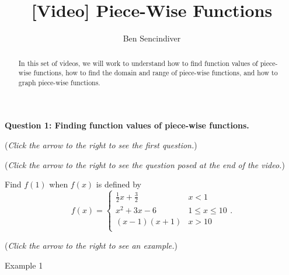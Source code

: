 \documentclass{ximera}
\title[Prerequisite Videos: ]{[Video] Piece-Wise Functions}
\author{Ben Sencindiver}
\begin{document}
\begin{abstract}
   In this set of videos, we will work to understand how to find function values of piece-wise functions, how to find the domain and range of piece-wise functions, and how to graph piece-wise functions.
\end{abstract}
\maketitle

\textbf{Question 1: Finding function values of piece-wise functions.}
\begin{question}
\begin{flushright}
{\color{blue}(\emph{Click the arrow to the right to see the first question.})}
\end{flushright}
\begin{center}
\begin{expandable}
\begin{flushright}
{\color{blue}(\emph{Click the arrow to the right to see the question
posed at the end of the video.})}
\end{flushright}
\begin{expandable}
Find $f(1)$ when $f(x)$ is defined by
\[ f(x) = \begin{cases} 
      \frac{1}{2}x + \frac{3}{2} & x<1 \\
     x^2+3x - 6 & 1\leq x\leq 10 \\
      (x-1)(x+1) & x>10\\	
   \end{cases}. \]
\begin{multipleChoice}
\end{multipleChoice}
\begin{flushright}
{\color{blue}(\emph{Click the arrow to the right to see an example.})}
\end{flushright}
\begin{expandable}
Example 1
\end{expandable}
\end{expandable}
\end{expandable}
\end{center}
\end{question}
\end{document}
